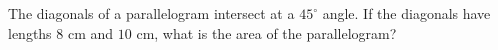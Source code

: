 The diagonals of a parallelogram intersect at a $45^\circ$ angle. If the diagonals have lengths $8$ cm and $10$ cm, what is the area of the parallelogram?
